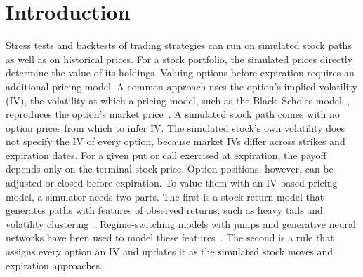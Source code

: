 \section{Introduction}\label{sec:introduction}

Stress tests and backtests of trading strategies can run on simulated stock paths as well as on historical prices. For a stock portfolio, the simulated prices directly determine the value of its holdings. Valuing options before expiration requires an additional pricing model. A common approach uses the option's implied volatility (IV), the volatility at which a pricing model, such as the Black--Scholes model~\citep{black1973}, reproduces the option's market price~\citep{latane1976}. A simulated stock path comes with no option prices from which to infer IV. The simulated stock's own volatility does not specify the IV of every option, because market IVs differ across strikes and expiration dates. For a given put or call exercised at expiration, the payoff depends only on the terminal stock price. Option positions, however, can be adjusted or closed before expiration. To value them with an IV-based pricing model, a simulator needs two parts. The first is a stock-return model that generates paths with features of observed returns, such as heavy tails and volatility clustering~\citep{cont2001}. Regime-switching models with jumps and generative neural networks have been used to model these features~\citep{wiese2020,jumphmm2025}. The second is a rule that assigns every option an IV and updates it as the simulated stock moves and expiration approaches.

